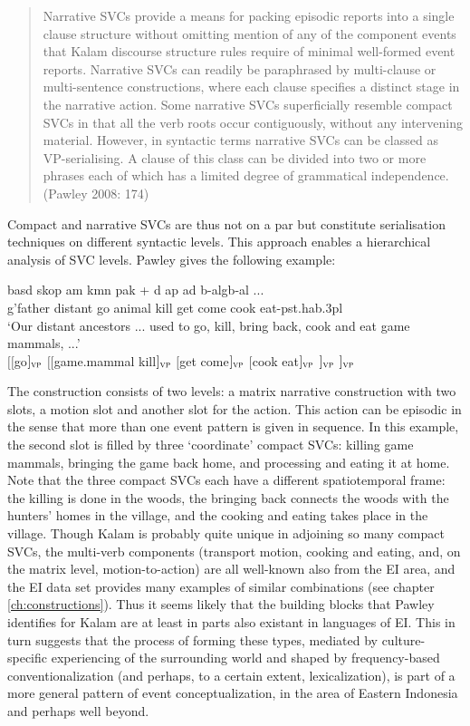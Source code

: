 \begin{quote}Narrative SVCs provide a means for packing episodic reports into a single clause structure without omitting mention of any of the component events that Kalam discourse structure rules require of minimal well-formed event reports. Narrative SVCs can readily be paraphrased by multi-clause or multi-sentence constructions, where each clause specifies a distinct stage in the narrative action. Some narrative SVCs superficially resemble compact SVCs in that all the verb roots occur contiguously, without any intervening material. However, in syntactic terms narrative SVCs can be classed as VP-serialising. A clause of this class can be divided into two or more phrases each of which has a limited degree of grammatical independence. (Pawley 2008: 174)\end{quote}

Compact and narrative SVCs are thus not on a par but constitute serialisation techniques on different syntactic levels. This approach enables a hierarchical analysis of SVC levels. Pawley gives the following example:

\pex \label{}
\a
\gll basd skop am kmn pak + d ap ad b-algb-al ... \\
g'father distant go animal kill get come cook eat-\acs{pst}.\acs{hab}.\acs{3}\acs{pl} \\
\glft `Our distant ancestors ... used to go, kill, bring back, cook and eat game mammals, ...' \\ 
\z
\a 
$[[$go$]_{\textsc{vp}}$ $[[$game.mammal kill$]_{\textsc{vp}}$ $[$get come$]_{\textsc{vp}}$ $[$cook eat$]_{\textsc{vp}}$ $]_{\textsc{vp}}$ $]_{\textsc{vp}}$
\xe

The construction consists of two levels: a matrix narrative construction with two slots, a motion slot and another slot for the action. This action can be episodic in the sense that more than one event pattern is given in sequence. In this example, the second slot is filled by three `coordinate' compact SVCs: killing game mammals, bringing the game back home, and processing and eating it at home. Note that the three compact SVCs each have a different spatiotemporal frame: the killing is done in the woods, the bringing back connects the woods with the hunters' homes in the village, and the cooking and eating takes place in the village. Though Kalam is probably quite unique in adjoining so many compact SVCs, the multi-verb components (transport motion, cooking and eating, and, on the matrix level, motion-to-action) are all well-known also from the EI area, and the EI data set provides many examples of similar combinations (see chapter \ref{ch:constructions}). Thus it seems likely that the building blocks that Pawley identifies for Kalam are at least in parts also existant in languages of EI. This in turn suggests that the process of forming these types, mediated by culture-specific experiencing of the surrounding world and shaped by frequency-based conventionalization (and perhaps, to a certain extent, lexicalization), is part of a more general pattern of event conceptualization, in the area of Eastern Indonesia and perhaps well beyond.

